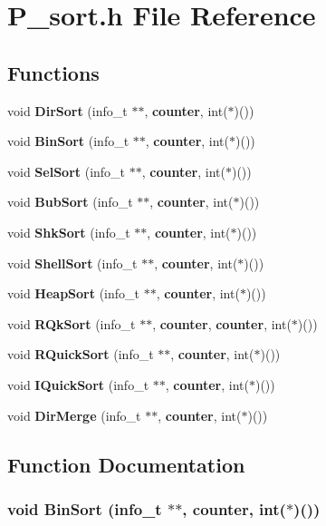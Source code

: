 \section{P\_\-sort.h File Reference}
\label{P__sort_8h}
\subsection*{Functions}
\begin{CompactItemize}
\item 
void {\bf Dir\-Sort} (info\_\-t $\ast$$\ast$, {\bf counter}, int($\ast$)())
\item 
void {\bf Bin\-Sort} (info\_\-t $\ast$$\ast$, {\bf counter}, int($\ast$)())
\item 
void {\bf Sel\-Sort} (info\_\-t $\ast$$\ast$, {\bf counter}, int($\ast$)())
\item 
void {\bf Bub\-Sort} (info\_\-t $\ast$$\ast$, {\bf counter}, int($\ast$)())
\item 
void {\bf Shk\-Sort} (info\_\-t $\ast$$\ast$, {\bf counter}, int($\ast$)())
\item 
void {\bf Shell\-Sort} (info\_\-t $\ast$$\ast$, {\bf counter}, int($\ast$)())
\item 
void {\bf Heap\-Sort} (info\_\-t $\ast$$\ast$, {\bf counter}, int($\ast$)())
\item 
void {\bf RQk\-Sort} (info\_\-t $\ast$$\ast$, {\bf counter}, {\bf counter}, int($\ast$)())
\item 
void {\bf RQuick\-Sort} (info\_\-t $\ast$$\ast$, {\bf counter}, int($\ast$)())
\item 
void {\bf IQuick\-Sort} (info\_\-t $\ast$$\ast$, {\bf counter}, int($\ast$)())
\item 
void {\bf Dir\-Merge} (info\_\-t $\ast$$\ast$, {\bf counter}, int($\ast$)())
\end{CompactItemize}


\subsection{Function Documentation}
\subsubsection{\setlength{\rightskip}{0pt plus 5cm}void Bin\-Sort (info\_\-t $\ast$$\ast$, {\bf counter}, int($\ast$)())}\label{P__sort_8h_a1}


